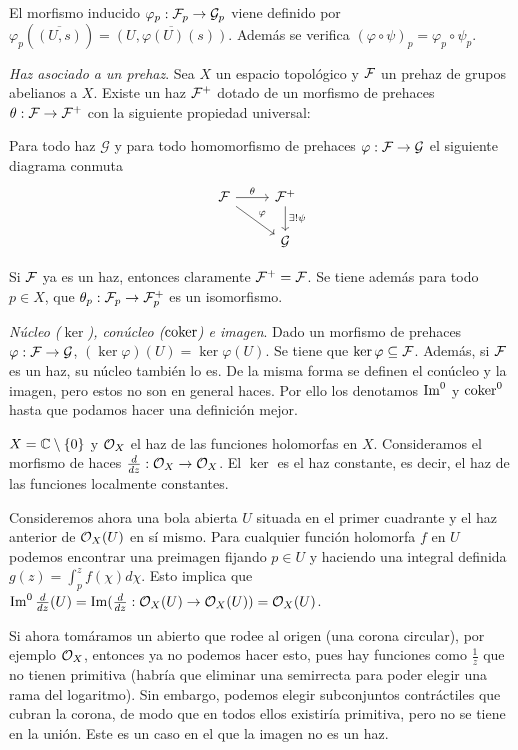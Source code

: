 \documentclass[GA.tex]{subfiles}
\begin{document}
El morfismo inducido $\varphi_p:\mathcal{F}_p\to \mathcal{G}_p$ viene definido por $\varphi_p(\overline{(U,s)})=\overline{(U, \varphi(U)(s))}$. Además se verifica $(\varphi\circ\psi)_p=\varphi_p\circ \psi_p$. 


\begin{defi}[Proposición]
\emph{Haz asociado a un prehaz}. Sea $X$ un espacio topológico y $\mathcal{F}$ un prehaz de grupos abelianos a $X$. Existe un haz $\mathcal{F}^+$ dotado de un morfismo de prehaces $\theta:\mathcal{F}\to\mathcal{F}^+$ con la siguiente propiedad universal:

Para todo haz $\mathcal{G}$ y para todo homomorfismo de prehaces $\varphi:\mathcal{F}\to\mathcal{G}$ el siguiente diagrama conmuta
\[
\begin{tikzcd}
\calF\arrow[r,"\theta"] \arrow[dr, "\varphi"]& \calF^+\arrow[d, "\exists!\psi"]\\
& \mathcal{G}
\end{tikzcd}
\]

\end{defi}

Si $\mathcal{F}$ ya es un haz, entonces claramente $\mathcal{F}^+=\mathcal{F}$. Se tiene además para todo $p\in X$, que $\theta_p:\mathcal{F}_p\to\mathcal{F}^+_p$ es un isomorfismo. 

\begin{defi}
\emph{Núcleo ($\ker$), conúcleo ($\operatorname{coker}$) e imagen}. Dado un morfismo de prehaces $\varphi:\mathcal{F}\to \mathcal{G}$,  $(\ker\varphi)(U)=\ker\varphi(U)$. Se tiene que $\ker\varphi\subseteq \mathcal{F}$. Además, si $\mathcal{F}$ es un haz, su núcleo también lo es.  De la misma forma se definen el conúcleo y la imagen, pero estos no son en general haces. Por ello los denotamos $\operatorname{Im}^0$ y $\operatorname{coker}^0$ hasta que podamos hacer una definición mejor.
\end{defi}

\begin{ej}\label{ej1}
$X=\mathbb{C}\setminus\{0\}$ y ${\mathcal O}_X$ el haz de las funciones holomorfas en $X$. Consideramos el morfismo de haces $\frac{d}{dz}:{\mathcal O}_X\to{\mathcal O}_X$. El $\ker$ es el haz constante, es decir, el haz de las funciones localmente constantes. 

Consideremos ahora una bola abierta $U$ situada en el primer cuadrante y el haz anterior de ${\mathcal O}_X(U)$ en sí mismo. Para cualquier función holomorfa $f$ en $U$ podemos encontrar una preimagen fijando $p\in U$ y haciendo una integral definida $g(z)=\int_p^zf(\chi)d\chi$. Esto implica que $\operatorname{Im}^0\frac{d}{dz}(U)=\operatorname{Im}(\frac{d}{dz}:{\mathcal O}_X(U)\to{\mathcal O}_X(U))={\mathcal O}_X(U)$. 

Si ahora tomáramos un abierto que rodee al origen (una corona circular), por ejemplo ${\mathcal O}_X$, entonces ya no podemos hacer esto, pues hay funciones como $\frac{1}{z}$ que no tienen primitiva (habría que eliminar una semirrecta para poder elegir una rama del logaritmo). Sin embargo, podemos elegir subconjuntos contráctiles que cubran la corona, de modo que en todos ellos existiría primitiva, pero no se tiene en la unión. Este es un caso en el que la imagen no es un haz. 
\end{ej}
\end{document}
